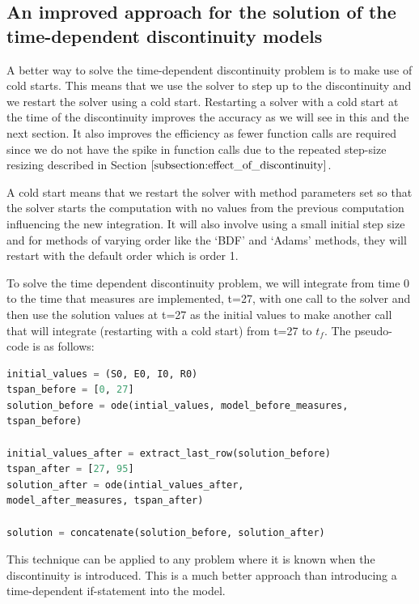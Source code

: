 \subsection{An improved approach for the solution of the time-dependent discontinuity models}
\label{subsection:time_disc_handling}
A better way to solve the time-dependent discontinuity problem is to make use of cold starts. This means that we use the solver to step up to the discontinuity and we restart the solver using a cold start. Restarting a solver with a cold start at the time of the discontinuity improves the accuracy as we will see in this and the next section. It also improves the efficiency as fewer function calls are required since we do not have the spike in function calls due to the repeated step-size resizing described in Section $\ref{subsection:effect_of_discontinuity}$.

A cold start means that we restart the solver with method parameters set so that the solver starts the computation with no values from the previous computation influencing the new integration. It will also involve using a small initial step size and for methods of varying order like the `BDF' and `Adams' methods, they will restart with the default order which is order 1.

To solve the time dependent discontinuity problem, we will integrate from time 0 to the time that measures are implemented, t=27, with one call to the solver and then use the solution values at t=27 as the initial values to make another call that will integrate (restarting with a cold start) from t=27 to $t_f$. The pseudo-code is as follows:

\begin{minipage}{\linewidth}
\begin{lstlisting}[language=Python]
initial_values = (S0, E0, I0, R0)
tspan_before = [0, 27]
solution_before = ode(intial_values, model_before_measures,
tspan_before)

initial_values_after = extract_last_row(solution_before)
tspan_after = [27, 95]
solution_after = ode(intial_values_after, 
model_after_measures, tspan_after)

solution = concatenate(solution_before, solution_after)
\end{lstlisting}
\end{minipage}

This technique can be applied to any problem where it is known when the discontinuity is introduced.  This is a much better approach than introducing a time-dependent if-statement into the model.

